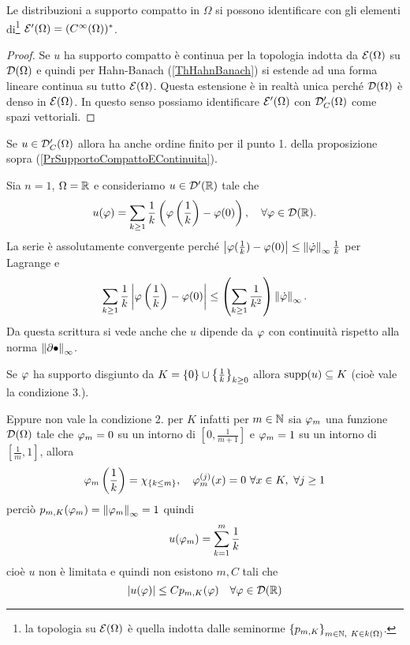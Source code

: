 \begin{corollary}
Le distribuzioni a supporto compatto in $\Omega$ si possono identificare con gli elementi di\footnote{la topologia su $\mathcal{E}(\Omega)$ \`e quella indotta dalle seminorme $\left\{{p_{m,K}}\right\}_{m\in\mathbb{N},\ K\in k(\Omega)}$.} $\mathcal{E}'(\Omega)=(C^\infty(\Omega))^\ast$.
\end{corollary}
\begin{proof}
Se $u$ ha supporto compatto \`e continua per la topologia indotta da $\mathcal{E}(\Omega)$ su $\mathcal{D}(\Omega)$ e quindi per Hahn-Banach (\ref{ThHahnBanach}) si estende ad una forma lineare continua su tutto $\mathcal{E}(\Omega)$. Questa estensione \`e in realt\`a unica perch\'e $\mathcal{D}(\Omega)$ \`e denso in $\mathcal{E}(\Omega)$. In questo senso possiamo identificare $\mathcal{E}'(\Omega)$ con $\mathcal{D}_C'(\Omega)$ come spazi vettoriali.
\end{proof}

\begin{remark}
Se $u\in \mathcal{D}_C'(\Omega)$ allora ha anche ordine finito per il punto 1. della proposizione sopra (\ref{PrSupportoCompattoEContinuita}).
\end{remark}

\begin{example}
Sia $n=1$, $\Omega=\mathbb{R}$ e consideriamo $u\in\mathcal{D}'(\mathbb{R})$ tale che
\[u(\varphi)=\sum_{k\geq 1}\frac1k\left({\varphi\left({\frac1k}\right)-\varphi(0)}\right),\quad \forall \varphi\in \mathcal{D}(\mathbb{R}).\]
La serie \`e assolutamente convergente perch\'e $\left|{\varphi(\frac1k)-\varphi(0)}\right|\leq\left\Vert{\dot{\varphi}}\right\Vert_\infty \frac1k$ per Lagrange e 
\[\sum_{k\geq 1}\frac1k\left|{\varphi\left({\frac1k}\right)-\varphi(0)}\right|\leq \left({\sum_{k\geq 1}\frac1{k^2}}\right)\left\Vert{\dot{\varphi}}\right\Vert_\infty.\]
Da questa scrittura si vede anche che $u$ dipende da $\varphi$ con continuit\`a rispetto alla norma $\left\Vert{\partial\bullet}\right\Vert_{\infty}$.

Se $\varphi$ ha supporto disgiunto da $K=\left\{{0}\right\}\cup\left\{{\frac1k}\right\}_{k\geq0}$ allora $\operatorname{supp}(u)\subseteq K$ (cio\`e vale la condizione 3.).

Eppure non vale la condizione 2. per $K$ infatti per $m\in \mathbb{N}$ sia $\varphi_m$ una funzione $\mathcal{D}(\Omega)$ tale che $\varphi_m=0$ su un intorno di $[0,\frac1{m+1}]$ e $\varphi_m=1$ su un intorno di $[\frac1m,1]$, allora
\[\varphi_m\left({\frac1k}\right)=\chi_{\left\{{k\leq m}\right\}},\quad \varphi_m^{(j)}(x)=0\ \forall x\in K,\ \forall j\geq 1\]
perci\`o $p_{m,K}(\varphi_m)=\left\Vert{\varphi_m}\right\Vert_{\infty}=1$ quindi
\[u(\varphi_m)=\sum_{k=1}^m\frac1k\]
cio\`e $u$ non \`e limitata e quindi non esistono $m,C$ tali che 
\[\left|{u(\varphi)}\right|\leq C p_{m,K}(\varphi)\quad \forall \varphi\in \mathcal{D}(\mathbb{R})\]
\end{example}


